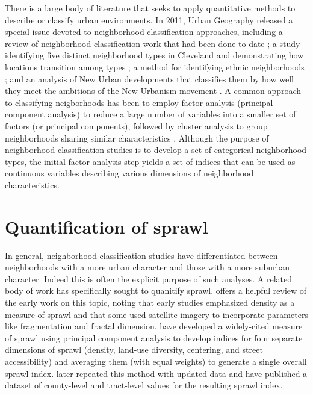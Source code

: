 \documentclass[
]{book}
\begin{document}
There is a large body of literature that seeks to apply quantitative methods to
describe or classify urban environments. In 2011, Urban Geography released a
special issue devoted to neighborhood classification approaches, including a
review of neighborhood classification work that had been done to date \citep{reibel2011classification};
a study identifying five distinct neighborhood types in Cleveland and
demonstrating how locations transition among types \citep{mikelbank2011neighborhood};
a method for identifying ethnic neighborhoods \citep{logan2011identifying}; and an
analysis of New Urban developments that classifies them by how well they meet the
ambitions of the New Urbanism movement \citep{trudeau2011suburbs}. A common approach to
classifying neigborhoods has been to employ factor analysis (principal
component analysis) to reduce a large number
of variables into a smaller set of factors (or principal components), followed by
cluster analysis to group neighborhoods sharing similar characteristics \citep{voulgaris_synergistic_2016, chow_differentiating_1998, li_neighborhood_2009, shay_automobiles_2007, song_quantitative_2007, song_how_2008, vicino_typology_2011}.
Although the purpose of neighborhood classification studies is to develop a set
of categorical neighborhood types, the initial factor analysis step yields a set
of indices that can be used as continuous variables describing various dimensions
of neighborhood characteristics.

\hypertarget{quantification-of-sprawl}{%
\section{Quantification of sprawl}\label{quantification-of-sprawl}}

In general, neighborhood classification studies have differentiated between
neighborhoods with a more urban character and those with a more suburban
character. Indeed this is often the explicit purpose of such analyses. A
related body of work has specifically sought to quanitify sprawl. \citet{hamidi2015measuring}
offers a helpful review of the early work on this topic, noting that early studies
emphasized density as a measure of sprawl and that some used satellite imagery
to incorporate parameters like fragmentation and fractal dimension. \citet{ewing_measuring_2002}
have developed a widely-cited measure of sprawl using principal component analysis
to develop indices for four separate dimensions of sprawl (density, land-use diversity,
centering, and street accessibility) and averaging them (with equal weights) to generate
a single overall sprawl index. \citet{hamidi2015measuring} later repeated this method with
updated data and have published a dataset of county-level and tract-level values
for the resulting sprawl index.
\end{document}
